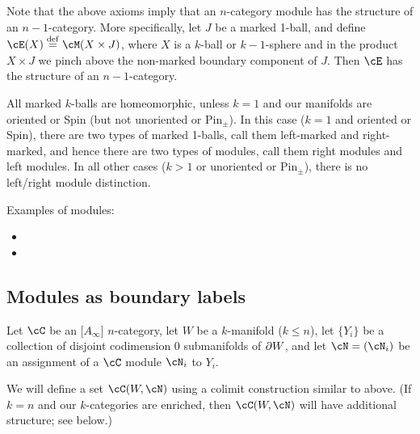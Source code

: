 \medskip

Note that the above axioms imply that an $n$-category module has the structure
of an $n{-}1$-category.
More specifically, let $J$ be a marked 1-ball, and define $\cE(X)\deq \cM(X\times J)$,
where $X$ is a $k$-ball or $k{-}1$-sphere and in the product $X\times J$ we pinch 
above the non-marked boundary component of $J$.
Then $\cE$ has the structure of an $n{-}1$-category.

All marked $k$-balls are homeomorphic, unless $k = 1$ and our manifolds
are oriented or Spin (but not unoriented or $\text{Pin}_\pm$).
In this case ($k=1$ and oriented or Spin), there are two types
of marked 1-balls, call them left-marked and right-marked,
and hence there are two types of modules, call them right modules and left modules.
In all other cases ($k>1$ or unoriented or $\text{Pin}_\pm$),
there is no left/right module distinction.

\medskip

Examples of modules:
\begin{itemize}
\item {}
\item {}
\end{itemize}

\subsection{Modules as boundary labels}
\label{moddecss}

Let $\cC$ be an [$A_\infty$] $n$-category, let $W$ be a $k$-manifold ($k\le n$),
let $\{Y_i\}$ be a collection of disjoint codimension 0 submanifolds of $\partial W$,
and let $\cN = (\cN_i)$ be an assignment of a $\cC$ module $\cN_i$ to $Y_i$.


We will define a set $\cC(W, \cN)$ using a colimit construction similar to above.
(If $k = n$ and our $k$-categories are enriched, then
$\cC(W, \cN)$ will have additional structure; see below.)

